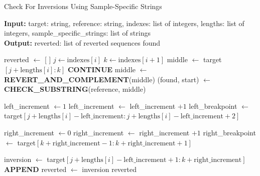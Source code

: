 \begin{algorithm}[H]
\caption{Check For Inversions Using Sample-Specific Strings}
\hspace*{\algorithmicindent} \textbf{Input: } target: string, reference: string, indexes: list of integers, lengths: list of integers, sample\_specific\_strings: list of strings \\
\hspace*{\algorithmicindent} \textbf{Output: } reverted: list of reverted sequences found 
\begin{algorithmic}[1]
\STATE reverted $\gets$ [ ] 
    \STATE $j \gets \text{indexes}[i]$ 
    \STATE $k \gets \text{indexes}[i + 1]$ 
    \STATE middle $\gets$ target$[j + \text{lengths}[i]:k]$ 
        \STATE \textbf{CONTINUE}
    \ENDIF
    \STATE middle $\gets$ \textbf{REVERT\_AND\_COMPLEMENT}(middle)
    \STATE (found, start) $\gets$ \textbf{CHECK\_SUBSTRING}(reference, middle) 
    
        \STATE left\_increment $\gets 1$
            \STATE left\_increment $\gets$ left\_increment $+ 1$ 
        \ENDWHILE
        \STATE left\_breakpoint $\gets$ target$[j + \text{lengths}[i] - \text{left\_increment}: j + \text{lengths}[i] - \text{left\_increment} + 2]$
        
        \STATE right\_increment $\gets 0$
            \STATE right\_increment $\gets$ right\_increment $+ 1$ 
        \ENDWHILE
        \STATE right\_breakpoint $\gets$ target$[k + \text{right\_increment} - 1: k + \text{right\_increment} + 1]$
        
        \STATE inversion $\gets$ target$[j + \text{lengths}[i] - \text{left\_increment} + 1: k + \text{right\_increment}]$
         \vspace{-2.9ex} 
        \STATE \textbf{APPEND} reverted $\gets$ inversion 
    \ENDIF
\ENDFOR
\RETURN reverted
\end{algorithmic}
\end{algorithm}





